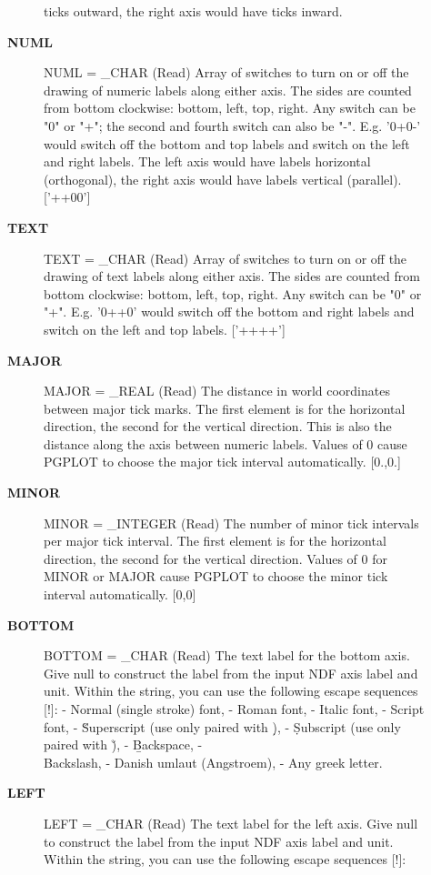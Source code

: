 \begin{description}
\begin{description}
   ticks outward, the right axis would have ticks inward.
\item [{\bf NUML}]
NUML = _CHAR (Read)
   Array of switches to turn on or off the drawing of numeric
   labels along either axis. The sides are counted from bottom
   clockwise: bottom, left, top, right. Any switch can be "0" or
   "+"; the second and fourth switch can also be "-". E.g. '0+0-'
   would switch off the bottom and top labels and switch on the
   left and right labels. The left axis would have labels
   horizontal (orthogonal), the right axis would have labels
   vertical (parallel). ['++00']
\item [{\bf TEXT}]
TEXT = _CHAR (Read)
   Array of switches to turn on or off the drawing of text labels
   along either axis. The sides are counted from bottom clockwise:
   bottom, left, top, right. Any switch can be "0" or "+".
   E.g. '0++0' would switch off the bottom and right labels and
   switch on the left and top labels. ['++++']
\item [{\bf MAJOR}]
MAJOR = _REAL (Read)
   The distance in world coordinates between major tick marks. The
    first element is for the horizontal direction, the second for
    the vertical direction. This is also the distance along the
    axis between numeric labels. Values of 0 cause PGPLOT to choose
    the major tick interval automatically. [0.,0.]
\item [{\bf MINOR}]
MINOR = _INTEGER (Read)
   The number of minor tick intervals per major tick interval. The
   first element is for the horizontal direction, the second for
   the vertical direction. Values of 0 for MINOR or MAJOR cause
   PGPLOT to choose the minor tick interval automatically. [0,0]
\item [{\bf BOTTOM}]
BOTTOM = _CHAR (Read)
   The text label for the bottom axis. Give null to construct the
   label from the input NDF axis label and unit. Within the
   string, you can use the following escape sequences [!]:
   - \fn Normal (single stroke) font,
   - \fr Roman font,
   - \fi Italic font,
   - \fs Script font,
   - \u  Superscript (use only paired with \d),
   - \d  Subscript (use only paired with \u),
   - \b  Backspace,
   - \\  Backslash,
   - \A  Danish umlaut (Angstroem),
   - \g  Any greek letter.
\item [{\bf LEFT}]
LEFT = _CHAR (Read)
   The text label for the left axis. Give null to construct the
   label from the input NDF axis label and unit. Within the
   string, you can use the following escape sequences [!]:

\end{description}
\end{description}
